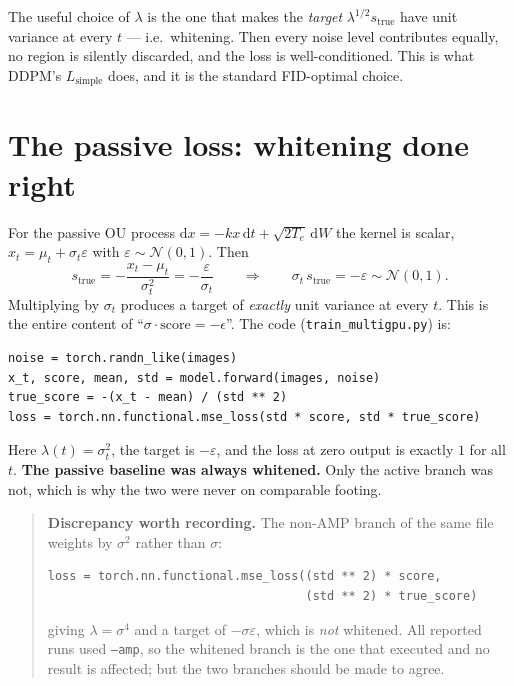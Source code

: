 \documentclass[11pt]{article}
\newcommand{\kk}{k}
\newcommand{\dd}{\mathrm{d}}
\newcommand{\Nor}{\mathcal{N}}
\begin{document}
The useful choice of $\lambda$ is the one that makes the \emph{target} $\lambda^{1/2}
s_{\text{true}}$ have unit variance at every $t$ --- i.e.\ whitening. Then every noise
level contributes equally, no region is silently discarded, and the loss is
well-conditioned. This is what DDPM's $L_{\text{simple}}$ does, and it is the standard
FID-optimal choice.

\section{The passive loss: whitening done right}

For the passive OU process $\dd x = -\kk x\,\dd t + \sqrt{2T_e}\,\dd W$ the kernel is
scalar, $x_t = \mu_t + \sigma_t\varepsilon$ with $\varepsilon\sim\Nor(0,1)$. Then
\begin{equation}
s_{\text{true}} = -\frac{x_t-\mu_t}{\sigma_t^{2}} = -\frac{\varepsilon}{\sigma_t}
\qquad\Longrightarrow\qquad
\sigma_t\, s_{\text{true}} = -\varepsilon \sim \Nor(0,1) .
\label{eq:passivewhiten}
\end{equation}
Multiplying by $\sigma_t$ produces a target of \emph{exactly} unit variance at every $t$.
This is the entire content of ``$\sigma\cdot\text{score} = -\epsilon$''. The code
(\texttt{train\_multigpu.py}) is:

\begin{verbatim}
noise = torch.randn_like(images)
x_t, score, mean, std = model.forward(images, noise)
true_score = -(x_t - mean) / (std ** 2)
loss = torch.nn.functional.mse_loss(std * score, std * true_score)
\end{verbatim}

\noindent
Here $\lambda(t)=\sigma_t^{2}$, the target is $-\varepsilon$, and the loss at zero output
is exactly $1$ for all $t$. \textbf{The passive baseline was always whitened.} Only the
active branch was not, which is why the two were never on comparable footing.

\begin{quote}\small
\textbf{Discrepancy worth recording.} The non-AMP branch of the same file weights by
$\sigma^{2}$ rather than $\sigma$:
\begin{verbatim}
loss = torch.nn.functional.mse_loss((std ** 2) * score,
                                    (std ** 2) * true_score)
\end{verbatim}
giving $\lambda=\sigma^{4}$ and a target of $-\sigma\varepsilon$, which is \emph{not}
whitened. All reported runs used \texttt{--amp}, so the whitened branch is the one that
executed and no result is affected; but the two branches should be made to agree.
\end{quote}
\end{document}
